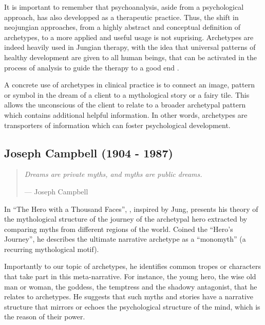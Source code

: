 \documentclass[
]{book}
\begin{document}
It is important to remember that psychoanalysis, aside from a psychological approach, has also developped as a therapeutic practice. Thus, the shift in neojungian approaches, from a highly abstract and conceptual definition of archetypes, to a more applied and useful usage is not suprising. Archetypes are indeed heavily used in Jungian therapy, with the idea that universal patterns of healthy development are given to all human beings, that can be activated in the process of analysis to guide the therapy to a good end \citep{roesler2012archetypes}.

A concrete use of archetypes in clinical practice is to connect an image, pattern or symbol in the dream of a client to a mythological story or a fairy tile. This allows the unconscious of the client to relate to a broader archetypal pattern which contains additional helpful information. In other words, archetypes are transporters of information which can foster psychological development.

\hypertarget{joseph-campbell-1904---1987}{%
\subsection{Joseph Campbell (1904 - 1987)}\label{joseph-campbell-1904---1987}}

\begin{quote}
\emph{Dreams are private myths, and myths are public dreams.}

\hfill --- Joseph Campbell
\end{quote}

In ``The Hero with a Thousand Faces'', \citet{campbell1949hero}, inspired by Jung, presents his theory of the mythological structure of the journey of the archetypal hero extracted by comparing myths from different regions of the world. Coined the ``Hero's Journey'', he describes the ultimate narrative archetype as a ``monomyth'' (a recurring mythological motif).

Importantly to our topic of archetypes, he identifies common tropes or characters that take part in this meta-narrative. For instance, the young hero, the wise old man or woman, the goddess, the temptress and the shadowy antagonist, that he relates to archetypes. He suggests that such myths and stories have a narrative structure that mirrors or echoes the psychological structure of the mind, which is the reason of their power.
\end{document}
